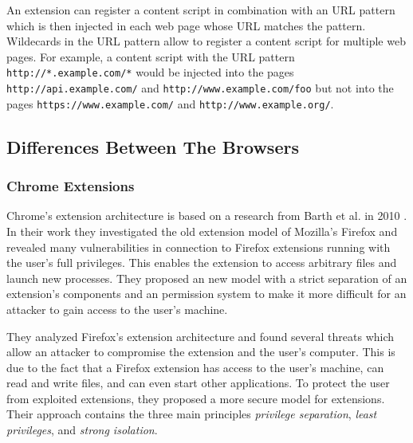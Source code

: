 	An extension can register a content script in combination with an URL pattern which is then injected in each web page whose URL matches the pattern. Wildecards in the URL pattern allow to register a content script for multiple web pages. For example, a content script with the URL pattern \texttt{http://*.example.com/*} would be injected into the pages \texttt{http://api.example.com/} and \texttt{http://www.example.com/foo} but not into the pages \texttt{https://www.example.com/} and \texttt{http://www.example.org/}.
			
\subsection{Differences Between The Browsers}

	
\subsubsection{Chrome Extensions}

	Chrome's extension architecture is based on a research from Barth et al. in 2010 \cite{Barth10protectingbrowsers}. In their work they investigated the old extension model of Mozilla's Firefox and revealed many vulnerabilities in connection to Firefox extensions running with the user's full privileges. This enables the extension to access arbitrary files and launch new processes. They proposed an new model with a strict separation of an extension's components and an permission system to make it more difficult for an attacker to gain access to the user's machine.
	
	
	
	 They analyzed Firefox's extension architecture and found several threats which allow an attacker to compromise the extension and the user's computer. This is due to the fact that a Firefox extension has access to the user's machine, can read and write files, and can even start other applications. To protect the user from exploited extensions, they proposed a more secure model for extensions. Their approach contains the three main principles \textit{privilege separation}, \textit{least privileges}, and \textit{strong isolation}. 
	
